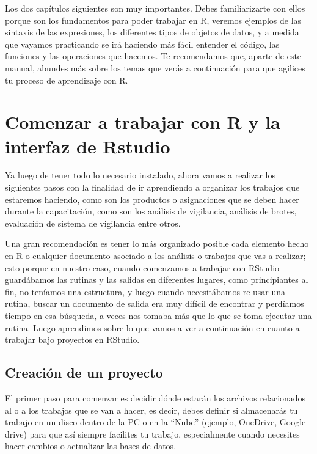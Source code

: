 \documentclass[
  letterpaper,
  DIV=11,
  numbers=noendperiod]{scrreprt}
\begin{document}
Los dos capítulos siguientes son muy importantes. Debes familiarizarte
con ellos porque son los fundamentos para poder trabajar en R, veremos
ejemplos de las sintaxis de las expresiones, los diferentes tipos de
objetos de datos, y a medida que vayamos practicando se irá haciendo más
fácil entender el código, las funciones y las operaciones que hacemos.
Te recomendamos que, aparte de este manual, abundes más sobre los temas
que verás a continuación para que agilices tu proceso de aprendizaje con
R.


\chapter{Comenzar a trabajar con R y la interfaz de
Rstudio}\label{comenzar-a-trabajar-con-r-y-la-interfaz-de-rstudio}

Ya luego de tener todo lo necesario instalado, ahora vamos a realizar
los siguientes pasos con la finalidad de ir aprendiendo a organizar los
trabajos que estaremos haciendo, como son los productos o asignaciones
que se deben hacer durante la capacitación, como son los análisis de
vigilancia, análisis de brotes, evaluación de sistema de vigilancia
entre otros.

Una gran recomendación es tener lo más organizado posible cada elemento
hecho en R o cualquier documento asociado a los análisis o trabajos que
vas a realizar; esto porque en nuestro caso, cuando comenzamos a
trabajar con RStudio guardábamos las rutinas y las salidas en diferentes
lugares, como principiantes al fin, no teníamos una estructura, y luego
cuando necesitábamos re-usar una rutina, buscar un documento de salida
era muy difícil de encontrar y perdíamos tiempo en esa búsqueda, a veces
nos tomaba más que lo que se toma ejecutar una rutina. Luego aprendimos
sobre lo que vamos a ver a continuación en cuanto a trabajar bajo
proyectos en RStudio.

\section{Creación de un proyecto}\label{creaciuxf3n-de-un-proyecto}

El primer paso para comenzar es decidir dónde estarán los archivos
relacionados al o a los trabajos que se van a hacer, es decir, debes
definir si almacenarás tu trabajo en un disco dentro de la PC o en la
``Nube'' (ejemplo, OneDrive, Google drive) para que así siempre
facilites tu trabajo, especialmente cuando necesites hacer cambios o
actualizar las bases de datos.
\end{document}

